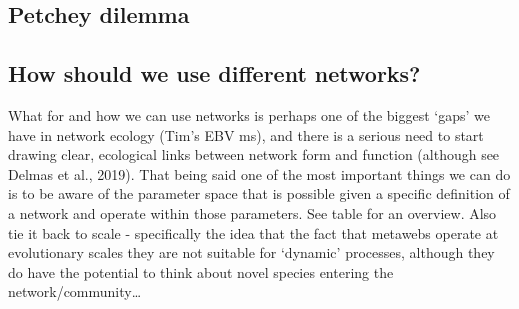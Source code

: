 \documentclass[
]{article}
\begin{document}
\subsection{Petchey dilemma}\label{petchey-dilemma}

\subsection{How should we use different
networks?}\label{how-should-we-use-different-networks}

What for and how we can use networks is perhaps one of the biggest
`gaps' we have in network ecology (Tim's EBV ms), and there is a serious
need to start drawing clear, ecological links between network form and
function (although see Delmas et al., 2019). That being said one of the
most important things we can do is to be aware of the parameter space
that is possible given a specific definition of a network and operate
within those parameters. See table for an overview. Also tie it back to
scale - specifically the idea that the fact that metawebs operate at
evolutionary scales they are not suitable for `dynamic' processes,
although they do have the potential to think about novel species
entering the network/community\ldots{}
\end{document}
